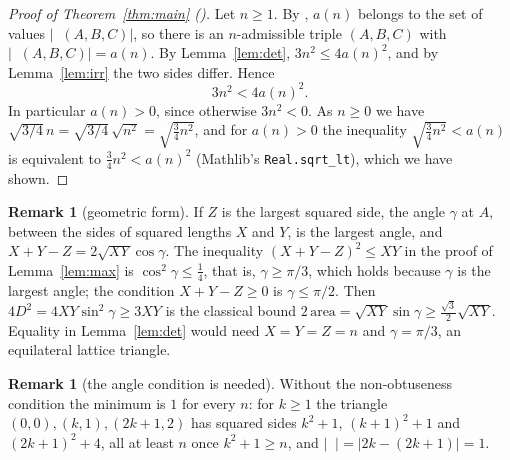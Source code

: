 \documentclass[11pt]{amsart}
\theoremstyle{plain}
\theoremstyle{definition}
\newtheorem{remark}[theorem]{Remark}
\DeclareMathOperator{\dett}{det_2}
\begin{document}
\begin{proof}[Proof of Theorem~\ref{thm:main} ()]
Let $n\ge1$. By , $a(n)$ belongs to the set of values $|\dett(A,B,C)|$, so there is an $n$-admissible triple $(A,B,C)$ with $|\dett(A,B,C)|=a(n)$. By Lemma~\ref{lem:det}, $3n^2\le4a(n)^2$, and by Lemma~\ref{lem:irr} the two sides differ. Hence
\[
  3n^2<4a(n)^2 .
\]
In particular $a(n)>0$, since otherwise $3n^2<0$. As $n\ge0$ we have $\sqrt{3/4}\,n=\sqrt{3/4}\,\sqrt{n^2}=\sqrt{\tfrac34n^2}$, and for $a(n)>0$ the inequality $\sqrt{\tfrac34n^2}<a(n)$ is equivalent to $\tfrac34n^2<a(n)^2$ (Mathlib's \texttt{Real.sqrt\_lt\textquotesingle}), which we have shown.
\end{proof}

\begin{remark}[geometric form]\label{rem:geom}
If $Z$ is the largest squared side, the angle $\gamma$ at $A$, between the sides of squared lengths $X$ and $Y$, is the largest angle, and $X+Y-Z=2\sqrt{XY}\cos\gamma$. The inequality $(X+Y-Z)^2\le XY$ in the proof of Lemma~\ref{lem:max} is $\cos^2\gamma\le\frac14$, that is, $\gamma\ge\pi/3$, which holds because $\gamma$ is the largest angle; the condition $X+Y-Z\ge0$ is $\gamma\le\pi/2$. Then $4D^2=4XY\sin^2\gamma\ge3XY$ is the classical bound $2\,\mathrm{area}=\sqrt{XY}\sin\gamma\ge\frac{\sqrt3}{2}\sqrt{XY}$. Equality in Lemma~\ref{lem:det} would need $X=Y=Z=n$ and $\gamma=\pi/3$, an equilateral lattice triangle.
\end{remark}

\begin{remark}[the angle condition is needed]
Without the non-obtuseness condition the minimum is $1$ for every $n$: for $k\ge1$ the triangle $(0,0),(k,1),(2k+1,2)$ has squared sides $k^2+1$, $(k+1)^2+1$ and $(2k+1)^2+4$, all at least $n$ once $k^2+1\ge n$, and $|\dett|=|2k-(2k+1)|=1$.
\end{remark}
\end{document}
